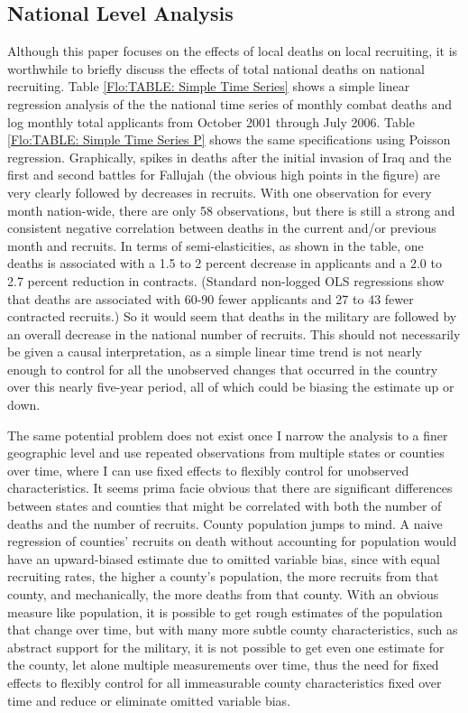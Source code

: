 \documentclass[12pt] {article}
\begin{document}
\subsection{National Level Analysis}
Although this paper focuses on the effects of local deaths on local
recruiting, it is worthwhile to briefly discuss the effects of total national
deaths on national recruiting. Table \ref{Flo:TABLE: Simple Time Series}
shows a simple linear regression analysis of the the national time series of monthly combat deaths and log monthly total applicants from October 2001 through July 2006. Table \ref{Flo:TABLE: Simple Time Series P} shows the same specifications using Poisson regression. Graphically, spikes in deaths after the initial invasion of Iraq and the first
and second battles for Fallujah (the obvious high points in the figure)
are very clearly followed by decreases in recruits. With one observation
for every month nation-wide, there are only 58 observations, but there
is still a strong and consistent negative correlation between deaths
in the current and/or previous month and recruits. In terms of semi-elasticities,
as shown in the table, one deaths is associated with a 1.5 to 2 percent decrease in applicants and a 2.0 to 2.7 percent reduction in contracts. (Standard non-logged OLS regressions show
that deaths are associated with 60-90 fewer applicants and 27 to 43
fewer contracted recruits.) So it would seem that deaths in the military
are followed by an overall decrease in the national number of recruits.
This should not necessarily be given a causal interpretation, as a
simple linear time trend is not nearly enough to control for all the
unobserved changes that occurred in the country over this nearly five-year
period, all of which could be biasing the estimate up or down. 

The same potential problem does not exist once I narrow the analysis
to a finer geographic level and use repeated observations from multiple
states or counties over time, where I can use fixed effects to flexibly control
for unobserved characteristics. It seems prima facie obvious that
there are significant differences between states and counties that
might be correlated with both the number of deaths and the number
of recruits. County population jumps to mind. A naive regression of
counties' recruits on death without accounting for population would
have an upward-biased estimate due to omitted variable bias, since
with equal recruiting rates, the higher a county's population, the
more recruits from that county, and mechanically, the more deaths
from that county. With an obvious measure like population, it is possible
to get rough estimates of the population that change over time, but
with many more subtle county characteristics, such as abstract support
for the military, it is not possible to get even one estimate for
the county, let alone multiple measurements over time, thus the need
for fixed effects to flexibly control for all immeasurable county
characteristics fixed over time and reduce or eliminate omitted variable bias.
\end{document}
